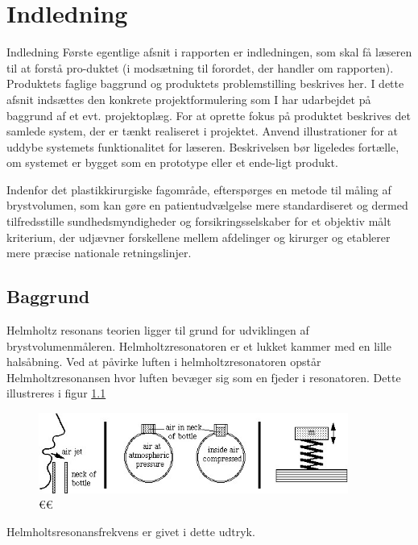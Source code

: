 \chapter{Indledning}

Indledning
Første egentlige afsnit i rapporten er indledningen, som skal få læseren til at forstå pro-duktet (i modsætning til forordet, der handler om rapporten). Produktets faglige baggrund og produktets problemstilling beskrives her.
I dette afsnit indsættes den konkrete projektformulering som I har udarbejdet på baggrund af et evt. projektoplæg.
For at oprette fokus på produktet beskrives det samlede system, der er tænkt realiseret i projektet. Anvend illustrationer for at uddybe systemets funktionalitet for læseren.
Beskrivelsen bør ligeledes fortælle, om systemet er bygget som en prototype eller et ende-ligt produkt.

 

Indenfor det plastikkirurgiske fagområde, efterspørges en metode til måling af brystvolumen, som kan gøre en patientudvælgelse mere standardiseret og dermed tilfredsstille sundhedsmyndigheder og forsikringsselskaber for et objektiv målt kriterium, der udjævner forskellene mellem afdelinger og kirurger og etablerer mere præcise nationale retningslinjer. 


\section{Baggrund}



Helmholtz resonans teorien ligger til grund for udviklingen af brystvolumenmåleren. Helmholtzresonatoren er et lukket kammer med en lille halsåbning. Ved at påvirke luften i helmholtzresonatoren opstår Helmholtzresonansen hvor luften bevæger sig som en fjeder i resonatoren. Dette illustreres i  figur \ref{fig:Helmholtzteori}

\begin{figure}[htb]
\centering
\includegraphics[width=4in]{Helmholtzresonans}
\caption{€€}
\label{fig:Helmholtzteori}
\end{figure}
 
Helmholtsresonansfrekvens er givet i dette udtryk. 

